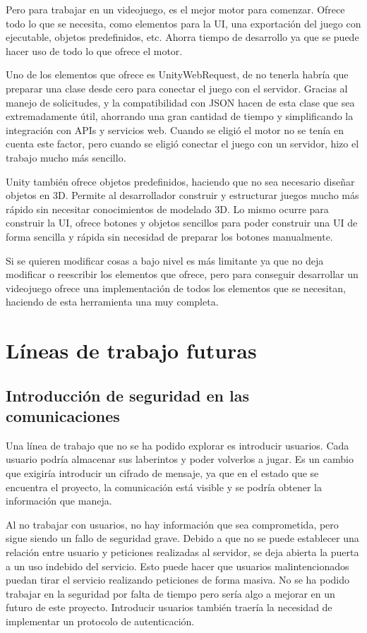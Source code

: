 Pero para trabajar en un videojuego, es el mejor motor para comenzar. Ofrece todo lo que se necesita, como elementos para la UI, una exportación del juego con ejecutable, objetos predefinidos, etc. Ahorra tiempo de desarrollo ya que se puede hacer uso de todo lo que ofrece el motor.

Uno de los elementos que ofrece es UnityWebRequest, de no tenerla habría que preparar una clase desde cero para conectar el juego con el servidor. Gracias al manejo de solicitudes, y la compatibilidad con JSON hacen de esta clase que sea extremadamente útil, ahorrando una gran cantidad de tiempo y simplificando la integración con APIs y servicios web. 
Cuando se eligió el motor no se tenía en cuenta este factor, pero cuando se eligió conectar el juego con un servidor, hizo el trabajo mucho más sencillo.

Unity también ofrece objetos predefinidos, haciendo que no sea necesario diseñar objetos en 3D. Permite al desarrollador construir y estructurar juegos mucho más rápido sin necesitar conocimientos de modelado 3D. Lo mismo ocurre para construir la UI, ofrece botones y objetos sencillos para poder construir una UI de forma sencilla y rápida sin necesidad de preparar los botones manualmente.

Si se quieren modificar cosas a bajo nivel es más limitante ya que no deja modificar o reescribir los elementos que ofrece, pero para conseguir desarrollar un videojuego ofrece una implementación de todos los elementos que se necesitan, haciendo de esta herramienta una muy completa. 


\section{Líneas de trabajo futuras}


\subsection{Introducción de seguridad en las comunicaciones}
Una línea de trabajo que no se ha podido explorar es introducir usuarios. Cada usuario podría almacenar sus laberintos y poder volverlos a jugar. Es un cambio que exigiría introducir un cifrado de mensaje, ya que en el estado que se encuentra el proyecto, la comunicación está visible y se podría obtener la información que maneja. 

Al no trabajar con usuarios, no hay información que sea comprometida, pero sigue siendo un fallo de seguridad grave.
Debido a que no se puede establecer una relación entre usuario y peticiones realizadas al servidor, se deja abierta la puerta a un uso indebido del servicio. Esto puede hacer que usuarios malintencionados puedan tirar el servicio realizando peticiones de forma masiva.
No se ha podido trabajar en la seguridad por falta de tiempo pero sería algo a mejorar en un futuro de este proyecto. Introducir usuarios también traería la necesidad de implementar un protocolo de autenticación.

